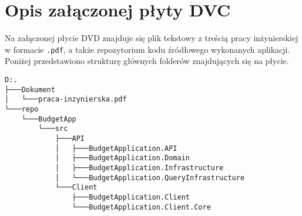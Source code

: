 \chapter{Opis załączonej płyty DVC}
Na załączonej płycie DVD znajduje się plik tekstowy z treścią pracy inżynierskiej w formacie \texttt{.pdf}, a także repozytorium kodu źródłowego wykonanych aplikacji. Poniżej przedstawiono strukturę głównych folderów znajdujących się na płycie.
{\small
\begin{verbatim}
D:.
├───Dokument
│   └───praca-inzynierska.pdf
└───repo
    └───BudgetApp
        └───src
            ├───API
            │   ├───BudgetApplication.API
            │   ├───BudgetApplication.Domain
            │   ├───BudgetApplication.Infrastructure
            │   └───BudgetApplication.QueryInfrastructure
            └───Client
                ├───BudgetApplication.Client
                └───BudgetApplication.Client.Core
\end{verbatim}
}
